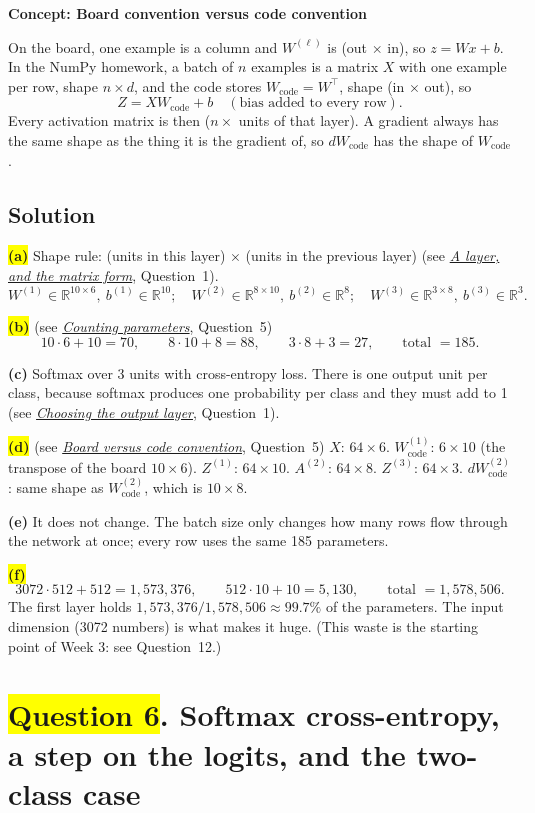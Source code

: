 \documentclass[12pt,a4paper]{article}
\newcommand{\concept}[2]{\par\medskip\phantomsection\label{#1}{\large\bfseries\color{blue!50!black} Concept: #2}\par}
\newcommand{\seeconcept}[3]{(see \hyperref[#1]{\textit{#2}}, Question~#3)}
\newcommand{\hlq}[1]{{\setlength{\fboxsep}{1.5pt}\colorbox{yellow}{#1}}}
\begin{document}
\concept{c:boardcode}{Board convention versus code convention}
On the board, one example is a column and $W^{(\ell)}$ is (out $\times$ in), so $z=Wx+b$. In the NumPy homework, a batch of $n$ examples is a matrix $X$ with one example per row, shape $n\times d$, and the code stores $W_{\text{code}}=W^\top$, shape (in $\times$ out), so
\[
Z=XW_{\text{code}}+b\quad(\text{bias added to every row}).
\]
Every activation matrix is then ($n\times$ units of that layer). A gradient always has the same shape as the thing it is the gradient of, so $dW_{\text{code}}$ has the shape of $W_{\text{code}}$.

\subsection*{Solution}
\hlq{\textbf{(a)}} Shape rule: (units in this layer) $\times$ (units in the previous layer) \seeconcept{c:layer}{A layer, and the matrix form}{1}.
\[
W^{(1)}\in\mathbb R^{10\times6},\ b^{(1)}\in\mathbb R^{10};\quad
W^{(2)}\in\mathbb R^{8\times10},\ b^{(2)}\in\mathbb R^{8};\quad
W^{(3)}\in\mathbb R^{3\times8},\ b^{(3)}\in\mathbb R^{3}.
\]

\hlq{\textbf{(b)}} \seeconcept{c:paramcount}{Counting parameters}{5}
\[
10\cdot6+10=70,\qquad 8\cdot10+8=88,\qquad 3\cdot8+3=27,\qquad\text{total }=185 .
\]

\textbf{(c)} Softmax over 3 units with cross-entropy loss. There is one output unit per class, because softmax produces one probability per class and they must add to 1 \seeconcept{c:outputs}{Choosing the output layer}{1}.

\hlq{\textbf{(d)}} \seeconcept{c:boardcode}{Board versus code convention}{5}
$X$: $64\times6$. $W^{(1)}_{\text{code}}$: $6\times10$ (the transpose of the board $10\times6$). $Z^{(1)}$: $64\times10$. $A^{(2)}$: $64\times8$. $Z^{(3)}$: $64\times3$. $dW^{(2)}_{\text{code}}$: same shape as $W^{(2)}_{\text{code}}$, which is $10\times8$.

\textbf{(e)} It does not change. The batch size only changes how many rows flow through the network at once; every row uses the same 185 parameters.

\hlq{\textbf{(f)}}
\[
3072\cdot512+512=1{,}573{,}376,\qquad 512\cdot10+10=5{,}130,\qquad\text{total }=1{,}578{,}506 .
\]
The first layer holds $1{,}573{,}376/1{,}578{,}506\approx99.7\%$ of the parameters. The input dimension (3072 numbers) is what makes it huge. (This waste is the starting point of Week 3: see Question~12.)

\section[Question 6. Softmax cross-entropy, a step on the logits, and the two-class case]{\hlq{Question 6}. Softmax cross-entropy, a step on the logits, and the two-class case}
\end{document}
